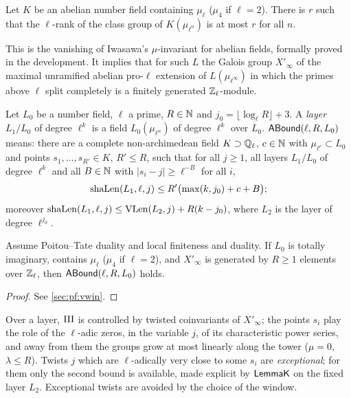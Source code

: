 \begin{littheorem}\label{lit:window:fw}
Let $K$ be an abelian number field containing $\mu_\ell$ ($\mu_4$ if $\ell=2$). There is $r$ such that the
$\ell$-rank of the class group of $K(\mu_{\ell^n})$ is at most $r$ for all $n$.
\end{littheorem}

This is the vanishing of Iwasawa's $\mu$-invariant for abelian fields, formally proved in the development. It
implies that for such $L$ the Galois group $X'_\infty$ of the maximal unramified abelian pro-$\ell$ extension of
$L(\mu_{\ell^\infty})$ in which the primes above $\ell$ split completely is a finitely generated $\mathbb{Z}_\ell$-module.

\begin{definition}\label{def:window:abound}
Let $L_0$ be a number field, $\ell$ a prime, $R\in\mathbb{N}$ and $j_0=\lfloor\log_\ell R\rfloor+3$. A \emph{layer} $L_1/L_0$
of degree $\ell^k$ is a field $L_0(\mu_{\ell^n})$ of degree $\ell^k$ over $L_0$. $\mathsf{ABound}(\ell,R,L_0)$ means:
there are a complete non-archimedean field $K\supset\mathbb{Q}_\ell$, $c\in\mathbb{N}$ with $\mu_{\ell^c}\subset L_0$ and points
$s_1,\dots,s_{R'}\in K$, $R'\le R$, such that for all $j\ge1$, all layers $L_1/L_0$ of degree $\ell^k$ and all
$B\in\mathbb{N}$ with $|s_i-j|\ge\ell^{-B}$ for all $i$,
\[
 \mathrm{shaLen}(L_1,\ell,j)\le R'\bigl(\max(k,j_0)+c+B\bigr);
\]
moreover $\mathrm{shaLen}(L_1,\ell,j)\le\mathrm{VLen}(L_2,j)+R(k-j_0)$, where $L_2$ is the layer of degree $\ell^{j_0}$.
\end{definition}

\begin{lemma}\Fmark\label{lem:window:tower}
Assume Poitou--Tate duality and local finiteness and duality. If $L_0$ is totally imaginary, contains $\mu_\ell$ ($\mu_4$ if $\ell=2$), and
$X'_\infty$ is generated by $R\ge1$ elements over $\mathbb{Z}_\ell$, then $\mathsf{ABound}(\ell,R,L_0)$ holds.
\end{lemma}
\begin{proof}See \cref{sec:pf:vwin}.
\end{proof}


Over a layer, $\mathrm{III}$ is controlled by twisted coinvariants of $X'_\infty$; the points $s_i$ play the role of the
$\ell$-adic zeros, in the variable $j$, of its characteristic power series, and away from them the groups grow at
most linearly along the tower ($\mu=0$, $\lambda\le R$). Twists $j$ which are $\ell$-adically very close to some $s_i$
are \emph{exceptional}; for them only the second bound is available, made explicit by $\mathsf{LemmaK}$ on the
fixed layer $L_2$. Exceptional twists are avoided by the choice of the window.

